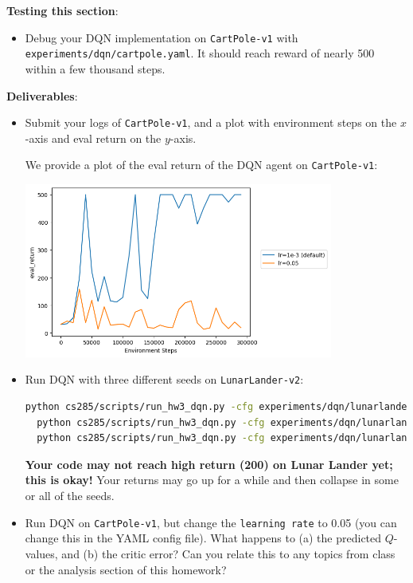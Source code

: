 \textbf{Testing this section}:
\begin{itemize}
    \item Debug your DQN implementation on \verb|CartPole-v1| with \verb|experiments/dqn/cartpole.yaml|. It should reach reward of nearly 500 within a few thousand steps.
\end{itemize}

\textbf{Deliverables}:
\begin{itemize}
    \item Submit your logs of \verb|CartPole-v1|, and a plot with environment steps on the $x$-axis and eval return on the $y$-axis.
    
    \begin{sol}
        We provide a plot of the eval return of the DQN agent on \texttt{CartPole-v1}:
        \begin{center}
        \includegraphics[width=4in]{../q2.4_cartpole_evalreturn.png}
        \end{center}
    \end{sol}

    \item Run DQN with three different seeds on \verb|LunarLander-v2|:
\begin{lstlisting}[language=bash,breaklines=true]
  python cs285/scripts/run_hw3_dqn.py -cfg experiments/dqn/lunarlander.yaml --seed 1
  python cs285/scripts/run_hw3_dqn.py -cfg experiments/dqn/lunarlander.yaml --seed 2
  python cs285/scripts/run_hw3_dqn.py -cfg experiments/dqn/lunarlander.yaml --seed 3
\end{lstlisting}
\textbf{Your code may not reach high return (200) on Lunar Lander yet; this is okay!} Your returns may go up for a while and then collapse in some or all of the seeds.
    \item Run DQN on \verb|CartPole-v1|, but change the \verb|learning rate| to 0.05 (you can change this in the YAML config file). What happens to (a) the predicted $Q$-values, and (b) the critic error? Can you relate this to any topics from class or the analysis section of this homework?


\end{itemize}
